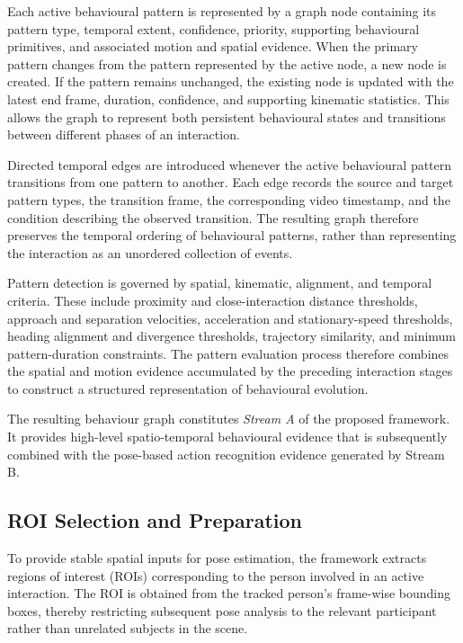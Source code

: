 \documentclass[conference]{IEEEtran}
\begin{document}
Each active behavioural pattern is represented by a graph node containing
its pattern type, temporal extent, confidence, priority, supporting
behavioural primitives, and associated motion and spatial evidence. When
the primary pattern changes from the pattern represented by the active
node, a new node is created. If the pattern remains unchanged, the
existing node is updated with the latest end frame, duration, confidence,
and supporting kinematic statistics. This allows the graph to represent
both persistent behavioural states and transitions between different
phases of an interaction.

Directed temporal edges are introduced whenever the active behavioural
pattern transitions from one pattern to another. Each edge records the
source and target pattern types, the transition frame, the corresponding
video timestamp, and the condition describing the observed transition.
The resulting graph therefore preserves the temporal ordering of
behavioural patterns, rather than representing the interaction as an
unordered collection of events.

Pattern detection is governed by spatial, kinematic, alignment, and
temporal criteria. These include proximity and close-interaction distance
thresholds, approach and separation velocities, acceleration and
stationary-speed thresholds, heading alignment and divergence
thresholds, trajectory similarity, and minimum pattern-duration
constraints. The pattern evaluation process therefore combines the
spatial and motion evidence accumulated by the preceding interaction
stages to construct a structured representation of behavioural
evolution.

The resulting behaviour graph constitutes \textit{Stream A} of the
proposed framework. It provides high-level spatio-temporal behavioural
evidence that is subsequently combined with the pose-based action
recognition evidence generated by Stream B.

\subsection{ROI Selection and Preparation}

To provide stable spatial inputs for pose estimation, the framework extracts
regions of interest (ROIs) corresponding to the person involved in an active
interaction. The ROI is obtained from the tracked person's frame-wise
bounding boxes, thereby restricting subsequent pose analysis to the relevant
participant rather than unrelated subjects in the scene.
\end{document}
